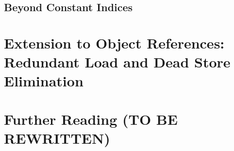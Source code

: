 
\subsection{Beyond Constant Indices}
\label{sec:non-const}



\section{Extension to Object References: Redundant Load and Dead Store Elimination}
\label{sec:heap}


\section{Further Reading (TO BE REWRITTEN)}
\label{sec:conclusions}


